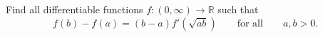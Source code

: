 Find all differentiable functions \(f\colon (0,\infty) \to \mathbb{R}\) such that
\[f(b)-f(a)=(b-a)f'(\sqrt{ab}) \qquad \text{for all}\qquad a,b>0.\]
